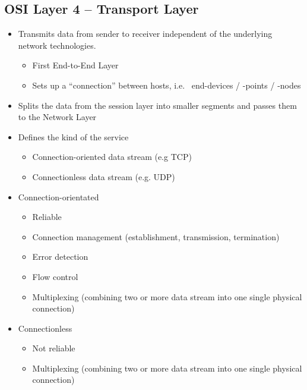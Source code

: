 \documentclass[11pt]{article}
\begin{document}
\subsection{OSI Layer 4 – Transport Layer}
\begin{itemize}
    \item Transmits data from sender to receiver independent of the underlying network technologies.
    \begin{itemize}
        \item First End-to-End Layer
        \item Sets up a “connection” between hosts, i.e. \ end-devices / -points / -nodes
    \end{itemize}
    \item Splits the data from the session layer into smaller segments and passes them to the Network Layer
    \item Defines the kind of the service
    \begin{itemize}
        \item Connection-oriented data stream (e.g TCP)
        \item Connectionless data stream (e.g. UDP)
    \end{itemize}
    \item Connection-orientated
    \begin{itemize}
        \item Reliable
        \item Connection management (establishment, transmission, termination)
        \item Error detection
        \item Flow control
        \item Multiplexing (combining two or more data stream into one single physical connection)
    \end{itemize}
    \item Connectionless
    \begin{itemize}
        \item Not reliable
        \item Multiplexing (combining two or more data stream into one single physical connection)
    \end{itemize}
\end{itemize}
\end{document}
